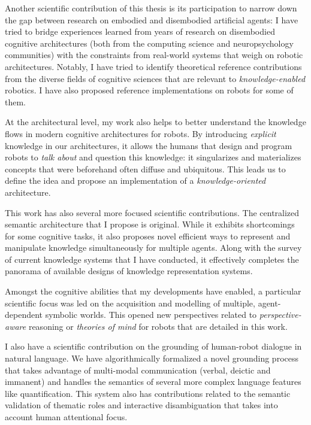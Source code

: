 Another scientific contribution of this thesis is its participation to
narrow down the gap between research on embodied and disembodied artificial
agents: I have tried to bridge experiences learned from years of research on
disembodied cognitive architectures (both from the computing science and
neuropsychology communities) with the constraints from real-world systems that
weigh on robotic architectures. Notably, I have tried to identify
theoretical reference contributions from the diverse fields of cognitive
sciences that are relevant to \emph{knowledge-enabled} robotics. I have also
proposed reference implementations on robots for some of them.

At the architectural level, my work also helps to better understand the
knowledge flows in modern cognitive architectures for robots. By introducing
\emph{explicit} knowledge in our architectures, it allows the humans that
design and program robots to \emph{talk about} and question this knowledge: it
singularizes and materializes concepts that were beforehand often
diffuse and ubiquitous. This leads us to define the idea and propose an
implementation of a \emph{knowledge-oriented} architecture.

This work has also several more focused scientific contributions. The
centralized semantic architecture that I propose is original. While it
exhibits shortcomings for some cognitive tasks, it also proposes novel efficient
ways to represent and manipulate knowledge simultaneously for multiple agents.
Along with the survey of current knowledge systems that I have conducted,
it effectively completes the panorama of available designs of knowledge
representation systems.

Amongst the cognitive abilities that my developments have enabled, a
particular scientific focus was led on the acquisition and modelling of
multiple, agent-dependent symbolic worlds. This opened new perspectives related
to \emph{perspective-aware} reasoning or \emph{theories of mind} for robots
that are detailed in this work.

I also have a scientific contribution on the grounding of human-robot
dialogue in natural language. We have algorithmically formalized a novel
grounding process that takes advantage of multi-modal communication (verbal,
deictic and immanent) and handles the semantics of several more complex
language features like quantification. This system also has contributions
related to the semantic validation of thematic roles and interactive
disambiguation that takes into account human attentional focus.

